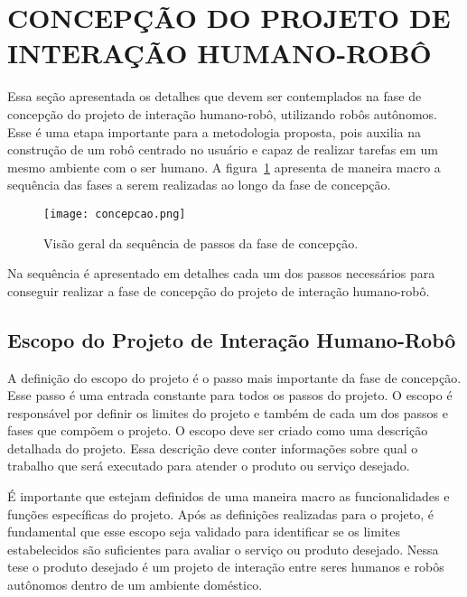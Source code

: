 \section{CONCEPÇÃO DO PROJETO DE INTERAÇÃO HUMANO-ROBÔ}
\label{sec:concepcao}
Essa seção apresentada os detalhes que devem ser contemplados na fase de concepção do projeto de interação humano-robô, utilizando robôs autônomos. Esse é uma etapa importante para a metodologia proposta, pois auxilia na construção de um robô centrado no usuário e capaz de realizar tarefas em um mesmo ambiente com o ser humano. A figura~\ref{fig:concepcao} apresenta de maneira macro a sequência das fases a serem realizadas ao longo da fase de concepção.

\begin{figure}[ht!]
    \centering
    \begin{minipage}{\textwidth}
        \caption{Visão geral da sequência de passos da fase de concepção.}
        \texttt{[image: concepcao.png]}
        \label{fig:concepcao}
    \end{minipage}
\end{figure}

Na sequência é apresentado em detalhes cada um dos passos necessários para conseguir realizar a fase de concepção do projeto de interação humano-robô.

\subsection{Escopo do Projeto de Interação Humano-Robô}
\label{sec:escopo}
A definição do escopo do projeto é o passo mais importante da fase de concepção. Esse passo é uma entrada constante para todos os passos do projeto. O escopo é responsável por definir os limites do projeto e também de cada um dos passos e fases que compõem o projeto. O escopo deve ser criado como uma descrição detalhada do projeto. Essa descrição deve conter informações sobre qual o trabalho que será executado para atender o produto ou serviço desejado. 

É importante que estejam definidos de uma maneira macro as funcionalidades e funções específicas do projeto. Após as definições realizadas para o projeto, é fundamental que esse escopo seja validado para identificar se os limites estabelecidos são suficientes para avaliar o serviço ou produto desejado. Nessa tese o produto desejado é um projeto de interação entre seres humanos e robôs autônomos dentro de um ambiente doméstico.

